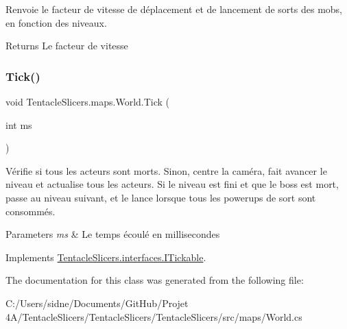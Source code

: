 Renvoie le facteur de vitesse de déplacement et de lancement de sorts des mobs, en fonction des niveaux. 

\begin{DoxyReturn}{Returns}
Le facteur de vitesse 
\end{DoxyReturn}
\mbox{\label{class_tentacle_slicers_1_1maps_1_1_world_a93c11c3e0f192f2eea8ff5368f2604a1}} 
\subsubsection{\texorpdfstring{Tick()}{Tick()}}
{\footnotesize\ttfamily void Tentacle\+Slicers.\+maps.\+World.\+Tick (\begin{DoxyParamCaption}\item[{int}]{ms }\end{DoxyParamCaption})}



Vérifie si tous les acteurs sont morts. Sinon, centre la caméra, fait avancer le niveau et actualise tous les acteurs. Si le niveau est fini et que le boss est mort, passe au niveau suivant, et le lance lorsque tous les powerups de sort sont consommés. 


\begin{DoxyParams}{Parameters}
{\em ms} & Le temps écoulé en millisecondes \\
\hline
\end{DoxyParams}


Implements \hyperlink{interface_tentacle_slicers_1_1interfaces_1_1_i_tickable}{Tentacle\+Slicers.\+interfaces.\+I\+Tickable}.



The documentation for this class was generated from the following file\+:\begin{DoxyCompactItemize}
\item 
C\+:/\+Users/sidne/\+Documents/\+Git\+Hub/\+Projet 4\+A/\+Tentacle\+Slicers/\+Tentacle\+Slicers/\+Tentacle\+Slicers/src/maps/World.\+cs\end{DoxyCompactItemize}
